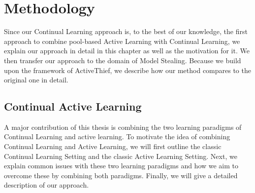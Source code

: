 
\chapter{Methodology}
\label{ch:Methodolody}

Since our Continual Learning approach is, to the best of our knowledge, the first approach to combine pool-based Active Learning with Continual
Learning, we explain our approach in detail in this chapter as well as the motivation for it. We then transfer our approach to the domain of Model
Stealing. Because we build upon the framework of ActiveThief, we describe how our method compares to the original one in detail.

\section{Continual Active Learning}
\label{sec:Methodology:ContinualActiveLearning}
A major contribution of this thesis is combining the two learning paradigms of Continual Learning and active learning. To motivate the idea of
combining Continual Learning and Active Learning, we will first outline the classic Continual Learning Setting and the classic Active Learning Setting.
Next, we explain common issues with these two learning paradigms and how we aim to overcome these by combining both paradigms. Finally, we will give
a detailed description of our approach. 

